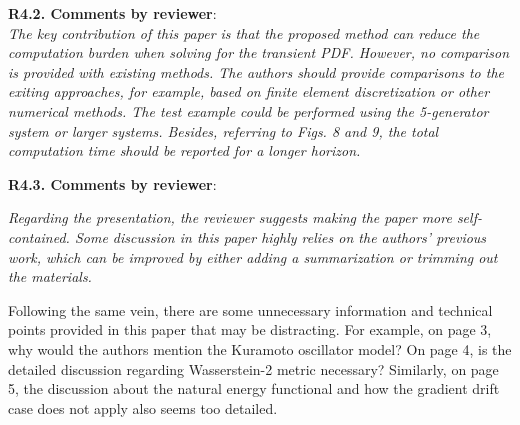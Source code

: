 \documentclass[12pt,onecolumn]{IEEEtran}
\newcommand{\blue}{\color{blue}}
\newcommand{\nib}{\noindent  {\bf Response:} }
\begin{document}
{\nib \blue{We appreciate the positive remark.}}


\noindent
{\bf R4.2. Comments by reviewer}:\\
{\em The key contribution of this paper is that the proposed method can reduce the computation burden when solving for the transient PDF. However, no comparison is provided with existing methods. The authors should provide comparisons to the exiting approaches, for example, based on finite element discretization or other numerical methods. The test example could be performed using the 5-generator system or larger systems. Besides, referring to Figs. 8 and 9, the total computation time should be reported for a longer horizon.}

{\nib \blue{TBD.}}


\noindent
{\bf R4.3. Comments by reviewer}:\\
{\em Regarding the presentation, the reviewer suggests making the paper more self-contained. Some discussion in this paper highly relies on the authors' previous work, which can be improved by either adding a summarization or trimming out the materials.

Following the same vein, there are some unnecessary information and technical points provided in this paper that may be distracting.
For example, on page 3, why would the authors mention the Kuramoto oscillator model?
On page 4, is the detailed discussion regarding Wasserstein-2 metric necessary? Similarly, on page 5, the discussion about the natural energy functional and how the gradient drift case does not apply also seems too detailed.}
\end{document}
